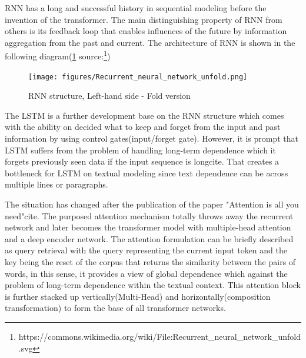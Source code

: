 \documentclass[12pt]{article}
\begin{document}
RNN has a long and successful history in sequential modeling before the invention of the transformer. The main distinguishing property of RNN from others is its feedback loop that enables influences of the future by information aggregation from the past and current. The architecture of RNN is shown in the following diagram(\ref{fig:RNN} source:\footnote{https://commons.wikimedia.org/wiki/File:Recurrent\_neural\_network\_unfold.svg})

\begin{figure} [!h]
\begin{center}
\texttt{[image: figures/Recurrent\_neural\_network\_unfold.png]}
\caption{RNN structure, Left-hand side - Fold version}
\label{fig:RNN}
\end{center}
\end{figure}
The LSTM is a further development base on the RNN structure which comes with the ability on decided what to keep and forget from the input and past information by using control gates(input/forget gate). However, it is prompt that LSTM suffers from the problem of handling long-term dependence which it forgets previously seen data if the input sequence is long{cite}. That creates a bottleneck for LSTM on textual modeling since text dependence can be across multiple lines or paragraphs. 

The situation has changed after the publication of the paper "Attention is all you need"{cite}. The purposed attention mechanism totally throws away the recurrent network and later becomes the transformer model with multiple-head attention and a deep encoder network. The attention formulation can be briefly described as query retrieval with the query representing the current input token and the key being the reset of the corpus that returns the similarity between the pairs of words, in this sense, it provides a view of global dependence which against the problem of long-term dependence within the textual context. This attention block is further stacked up vertically(Multi-Head) and horizontally(composition transformation) to form the base of all transformer networks.   

\newpage
\end{document}
